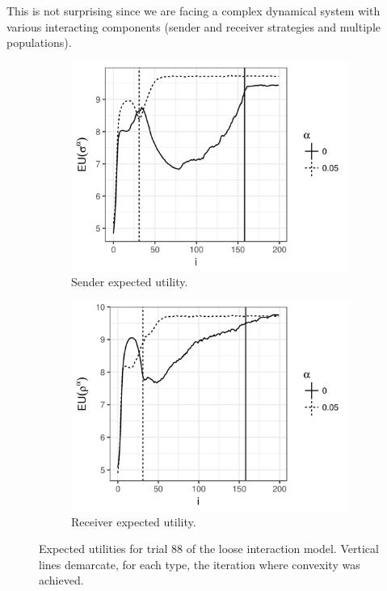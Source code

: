 \documentclass[a4paper]{article}
\begin{document}
This is not surprising since we are facing a complex dynamical system with various interacting components (sender and receiver strategies and multiple populations).
\begin{figure}
  \centering
  \begin{subfigure}[]{0.45\textwidth}
    \includegraphics[width=\textwidth]{simulation/results/round-3/plots/sender-eu-trial-88-0-005-weakest.png}
    \caption{Sender expected utility.}
    \label{fig:sender-eu-trial-88-loose-interaction}
  \end{subfigure}
  \hfill
  \begin{subfigure}[]{0.45\textwidth}
    \includegraphics[width=\textwidth]{simulation/results/round-3/plots/receiver-eu-trial-88-0-005-weakest.png}
    \caption{Receiver expected utility.}
    \label{fig:receiver-eu-trial-88-loose-interaction}
  \end{subfigure}
  \caption{Expected utilities for trial 88 of the loose interaction model. Vertical lines demarcate, for each type, the iteration where convexity was achieved.}
  \label{fig:eu-trial-88-loose-interaction}
\end{figure}
\end{document}

